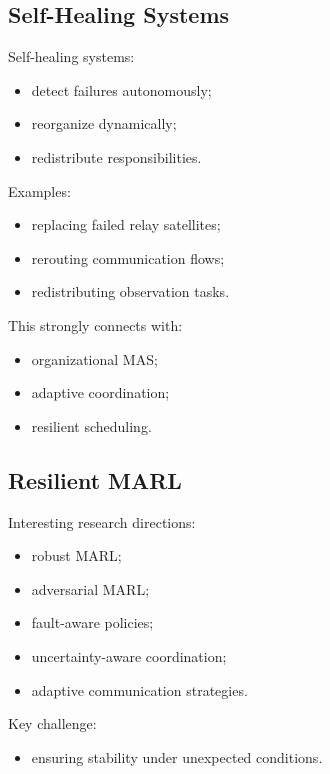 \documentclass[10pt,a4paper,twocolumn]{article}
\begin{document}

\subsection{Self-Healing Systems}

Self-healing systems:
\begin{itemize}
    \item detect failures autonomously;
    \item reorganize dynamically;
    \item redistribute responsibilities.
\end{itemize}

Examples:
\begin{itemize}
    \item replacing failed relay satellites;
    \item rerouting communication flows;
    \item redistributing observation tasks.
\end{itemize}

This strongly connects with:
\begin{itemize}
    \item organizational MAS;
    \item adaptive coordination;
    \item resilient scheduling.
\end{itemize}


\subsection{Resilient MARL}

Interesting research directions:
\begin{itemize}
    \item robust MARL;
    \item adversarial MARL;
    \item fault-aware policies;
    \item uncertainty-aware coordination;
    \item adaptive communication strategies.
\end{itemize}

Key challenge:
\begin{itemize}
    \item ensuring stability under unexpected conditions.
\end{itemize}
\end{document}

